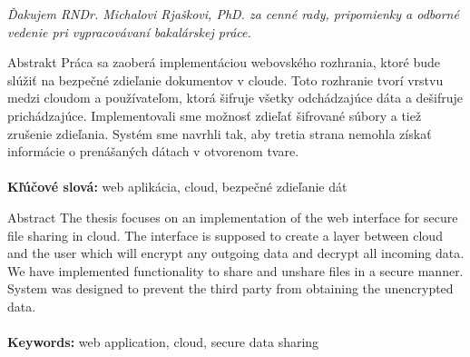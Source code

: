 \documentclass[12pt, oneside]{book}
\begin{document}
\par\vspace*{\fill}
\textit{
Ďakujem RNDr. Michalovi Rjaškovi, PhD. za cenné
rady, pripomienky a odborné vedenie pri vypracovávaní
bakalárskej práce.
}


\newpage 
\thispagestyle{empty}

\huge{Abstrakt}
\normalsize
\newline
\newline
Práca sa zaoberá implementáciou webovského rozhrania, ktoré bude slúžiť na bezpečné zdieľanie dokumentov v cloude. 
Toto rozhranie tvorí vrstvu medzi cloudom a používateľom, ktorá šifruje všetky odchádzajúce dáta a dešifruje prichádzajúce.
Implementovali sme možnosť zdieľať šifrované súbory a tiež zrušenie zdieľania. Systém sme navrhli tak, aby tretia strana nemohla
získať informácie o prenášaných dátach v otvorenom tvare.
\\\\
{\bf Kľúčové slová:} web aplikácia, cloud, bezpečné zdieľanie dát


\newpage 
\thispagestyle{empty}

\huge{Abstract}
\normalsize
\newline
\newline
The thesis focuses on an implementation of the web interface for secure file sharing in cloud. The interface is supposed to create a layer between cloud and the user which will encrypt any outgoing data and decrypt all incoming data. We have implemented functionality to share and unshare files in a secure manner. System was designed to prevent the third party from obtaining the unencrypted data.
\\\\
{\bf Keywords:} web application, cloud, secure data sharing


%
%
\end{document}
